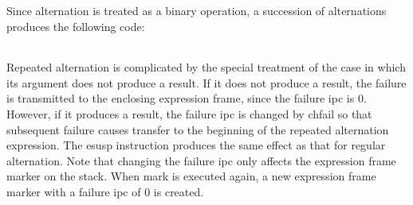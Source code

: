 Since alternation is treated as a binary operation, a succession of
alternations produces the following code:

\begin{center}
\tablelasttail{\hline}
\begin{xtabular}{|m{1.9073598in}|m{2.75596in}|}

\end{xtabular}
\end{center}

Repeated alternation is complicated by the special treatment of the
case in which its argument does not produce a result. If it does not
produce a result, the failure is transmitted to the enclosing
expression frame, since the failure ipc is 0. However, if it produces
a result, the failure ipc is changed by chfail so that subsequent
failure causes transfer to the beginning of the repeated alternation
expression. The esusp instruction produces the same effect as that for
regular alternation. Note that changing the failure ipc only affects
the expression frame marker on the stack. When mark is executed again,
a new expression frame marker with a failure ipc of 0 is created.

